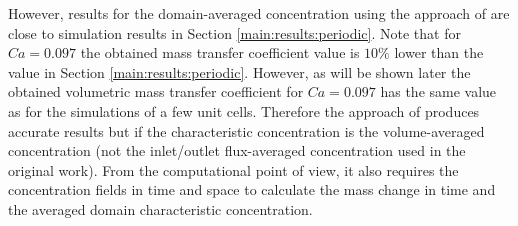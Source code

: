 \documentclass[review,12pt]{elsarticle}
\begin{document}
However, results for the domain-averaged concentration using the approach of \citeauthor{vanbaten-circular} are close to simulation results in Section
\ref{main:results:periodic}. %
Note that for $Ca=0.097$ the obtained mass transfer coefficient value is $10\%$ 
lower than the value in Section \ref{main:results:periodic}. However, as will
be shown later the obtained volumetric mass transfer coefficient for
$Ca=0.097$ has the same value as for the simulations of a few unit cells.
Therefore the approach of \citet{vanbaten-circular} produces  accurate results but if the characteristic concentration is the volume-averaged concentration (not the inlet/outlet flux-averaged concentration used in the original work). From the computational point of view, it also requires the concentration fields in time and space to calculate the mass change in time and the averaged domain
characteristic concentration.
\end{document}
